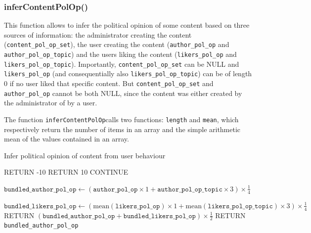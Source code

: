 \documentclass[a4paper]{article}
\begin{document}
\subsubsection{inferContentPolOp()}

This function allows to infer the political opinion of some content based on three sources of information: the administrator creating the content (\verb|content_pol_op_set|), the user creating the content (\verb|author_pol_op| and \verb|author_pol_op_topic|) and the users liking the content (\verb|likers_pol_op| and \verb|likers_pol_op_topic|). Importantly, \verb|content_pol_op_set| can be NULL and  \verb|likers_pol_op| (and consequentially also \verb|likers_pol_op_topic|) can be of length 0 if no user liked that specific content. But \verb|content_pol_op_set| and \verb|author_pol_op| cannot be both NULL, since the content was either created by the administrator of by a user.

The function \verb|inferContentPolOp|calls two functions: \verb|length| and \verb|mean|, which respectively return the number of items in an array and the simple arithmetic mean of the values contained in an array.

\begin{algorithm}
\caption{Infer political opinion of content from user behaviour}\label{algo:inferContentPolOp}
\begin{algorithmic}[1]

    \State RETURN -10
    \EndIf
    \State RETURN 10
    \Else
    \State CONTINUE
     \EndIf
     \EndIf

     \State $\texttt{bundled\_author\_pol\_op} \gets (\texttt{author\_pol\_op} \times 1 + \texttt{author\_pol\_op\_topic} \times 3) \times \frac{1}{4}$

     \State $\texttt{bundled\_likers\_pol\_op} \gets (\text{mean}(\texttt{likers\_pol\_op}) \times 1 + \text{mean}(\texttt{likers\_pol\_op\_topic}) \times 3) \times \frac{1}{4}$
     \State RETURN  $(\texttt{bundled\_author\_pol\_op} + \texttt{bundled\_likers\_pol\_op}) \times \frac{1}{2}$
     \Else
     \State RETURN \texttt{bundled\_author\_pol\_op}
     \EndIf

     

  \EndProcedure
\end{algorithmic}
\end{algorithm}
 
\end{document}
